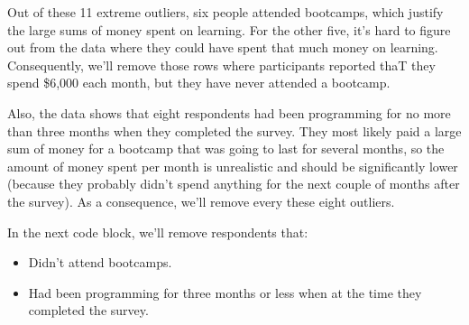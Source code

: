 \documentclass[
]{article}
\newenvironment{Shaded}{\begin{snugshade}}{\end{snugshade}}
\newcommand{\CommentTok}[1]{\textcolor[rgb]{0.56,0.35,0.01}{\textit{#1}}}
\newcommand{\DecValTok}[1]{\textcolor[rgb]{0.00,0.00,0.81}{#1}}
\newcommand{\FunctionTok}[1]{\textcolor[rgb]{0.00,0.00,0.00}{#1}}
\newcommand{\NormalTok}[1]{#1}
\newcommand{\OtherTok}[1]{\textcolor[rgb]{0.56,0.35,0.01}{#1}}
\newcommand{\SpecialCharTok}[1]{\textcolor[rgb]{0.00,0.00,0.00}{#1}}
\newcommand{\StringTok}[1]{\textcolor[rgb]{0.31,0.60,0.02}{#1}}
\providecommand{\tightlist}{%
  \setlength{\itemsep}{0pt}\setlength{\parskip}{0pt}}
\begin{document}
Out of these 11 extreme outliers, six people attended bootcamps, which
justify the large sums of money spent on learning. For the other five,
it's hard to figure out from the data where they could have spent that
much money on learning. Consequently, we'll remove those rows where
participants reported thaT they spend \$6,000 each month, but they have
never attended a bootcamp.

Also, the data shows that eight respondents had been programming for no
more than three months when they completed the survey. They most likely
paid a large sum of money for a bootcamp that was going to last for
several months, so the amount of money spent per month is unrealistic
and should be significantly lower (because they probably didn't spend
anything for the next couple of months after the survey). As a
consequence, we'll remove every these eight outliers.

In the next code block, we'll remove respondents that:

\begin{itemize}
\tightlist
\item
  Didn't attend bootcamps.
\item
  Had been programming for three months or less when at the time they
  completed the survey.
\end{itemize}

\begin{Shaded}
\end{Shaded}
\end{document}
